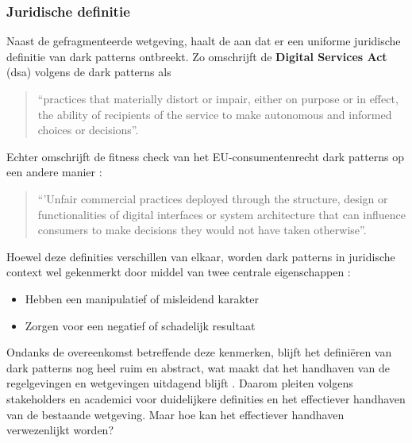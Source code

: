 \vspace{1em}

\subsubsection{Juridische definitie}

Naast de gefragmenteerde wetgeving, haalt de \textcite{EPRS2025} aan dat er een uniforme juridische definitie van dark patterns ontbreekt. Zo omschrijft de \textbf{Digital Services Act} (\acrshort{dsa}) volgens de \textcite{EPRS2025} dark patterns als

\begin{quote}
    “practices that materially distort or impair, either on purpose or in effect, the ability of recipients of the service to make autonomous and informed choices or decisions”.
\end{quote}

Echter omschrijft de fitness check van het EU-consumentenrecht dark patterns op een andere manier \autocite{EPRS2025}:

\begin{quote}
    “'Unfair commercial practices deployed through the structure, design or functionalities of digital interfaces or system architecture that can influence consumers to make decisions they would not have taken otherwise”.
\end{quote}

Hoewel deze definities verschillen van elkaar, worden dark patterns in juridische context wel gekenmerkt door middel van twee centrale eigenschappen \autocite{EPRS2025}: 

\begin{itemize}
    \item Hebben een manipulatief of misleidend karakter
    \item Zorgen voor een negatief of schadelijk resultaat
\end{itemize}

Ondanks de overeenkomst betreffende deze kenmerken, blijft het definiëren van dark patterns nog heel ruim en abstract, wat maakt dat het handhaven van de regelgevingen en wetgevingen uitdagend blijft \autocite{EPRS2025}. Daarom pleiten volgens \textcite{EPRS2025} stakeholders en academici voor duidelijkere definities en het effectiever handhaven van de bestaande wetgeving. Maar hoe kan het effectiever handhaven verwezenlijkt worden?

\vspace{1em}

